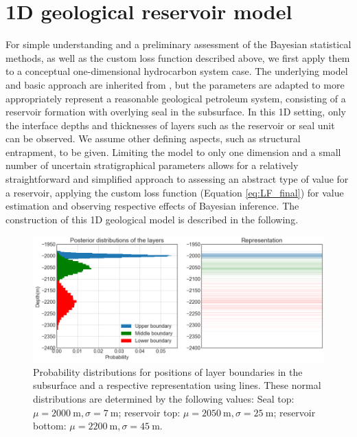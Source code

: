 		\section{1D geological reservoir model}\label{sec:1D_model}
		For simple understanding and a preliminary assessment of the Bayesian statistical methods, as well as the custom loss function described above, we first apply them to a conceptual one-dimensional hydrocarbon system case. The underlying model and basic approach are inherited from \citet{delaVarga2016}, but the parameters are adapted to more appropriately represent a reasonable geological petroleum system, consisting of a reservoir formation with overlying seal in the subsurface. In this 1D setting, only the interface depths and thicknesses of layers such as the reservoir or seal unit can be observed. We assume other defining aspects, such as structural entrapment, to be given. Limiting the model to only one dimension and a small number of uncertain stratigraphical parameters allows for a relatively straightforward and simplified approach to assessing an abstract type of value for a reservoir, applying the custom loss function (Equation \ref{eq:LF_final}) for value estimation and observing respective effects of Bayesian inference. The construction of this 1D geological model is described in the following.
			\begin{figure}[h]
				\centering
				\includegraphics[width=1\textwidth]{Figures/1D_model.png}
				\caption{Probability distributions for positions of layer boundaries in the subsurface and a respective representation using lines. These normal distributions are determined by the following values: Seal top: $\mu = 2000~\text{m}, \sigma = 7~\text{m}$; reservoir top: $\mu=2050~\text{m}, \sigma = 25~\text{m}$; reservoir bottom: $\mu = 2200~\text{m}, \sigma = 45~\text{m}$. }\label{fig:1D_model}
			\end{figure}
